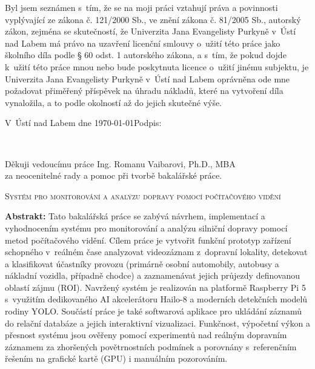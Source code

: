\documentclass[male,czech,api_bc]{kitheses}
\newcommand{\nazevcz}{Systém pro monitorování a analýzu dopravy pomocí počítačového vidění}
\newcommand{\vedouciDAT}{Ing. Romanu Vaibarovi, Ph.D., MBA}
\begin{document}
\vspace{0.5em}

Byl jsem seznámen 
s~tím, že se na moji práci vztahují práva a povinnosti vyplývající ze
zákona č. 121/2000 Sb., ve znění zákona č. 81/2005 Sb., autorský zákon, zejména se
skutečností, že Univerzita Jana Evangelisty Purkyně v~Ústí nad Labem má právo na uzavření
licenční smlouvy o~užití této práce jako školního díla podle § 60 odst. 1 autorského zákona, a
s~tím, že pokud dojde k~užití této práce mnou nebo bude poskytnuta licence o~užití jinému
subjektu, je Univerzita Jana Evangelisty Purkyně v~Ústí nad Labem oprávněna ode mne
požadovat přiměřený příspěvek na úhradu nákladů, které na vytvoření díla vynaložila, a to
podle okolností až do jejich skutečné výše.

\vspace{2em}

V~Ústí nad Labem dne \today   \hfill Podpis: \makebox[4cm][s]{\dotfill}

\cleardoublepage
\thispagestyle{empty}
~
\vfill

\begin{flushright}
    Děkuji vedoucímu práce {\vedouciDAT}\\ 
    za neocenitelné rady a pomoc při tvorbě bakalářské práce.
\end{flushright}

\cleardoublepage

\textsc{\nazevcz}

\textbf{Abstrakt:}
Tato bakalářská práce se zabývá návrhem, implementací a vyhodnocením systému pro monitorování a analýzu silniční dopravy pomocí metod počítačového vidění. Cílem práce je vytvořit funkční prototyp zařízení schopného v~reálném čase analyzovat videozáznam z~dopravní lokality, detekovat a klasifikovat účastníky provozu (primárně osobní automobily, autobusy a nákladní vozidla, případně chodce) a zaznamenávat jejich průjezdy definovanou oblastí zájmu (ROI). Navržený systém je realizován na platformě Raspberry Pi 5 s~využitím dedikovaného AI akcelerátoru Hailo-8 a moderních detekčních modelů rodiny YOLO. Součástí práce je také softwarová aplikace pro ukládání záznamů do relační databáze a jejich interaktivní vizualizaci. Funkčnost, výpočetní výkon a přesnost systému jsou ověřeny pomocí experimentů nad reálným dopravním záznamem za zhoršených povětrnostních podmínek a porovnány s~referenčním řešením na grafické kartě (GPU) i manuálním pozorováním.
\end{document}
